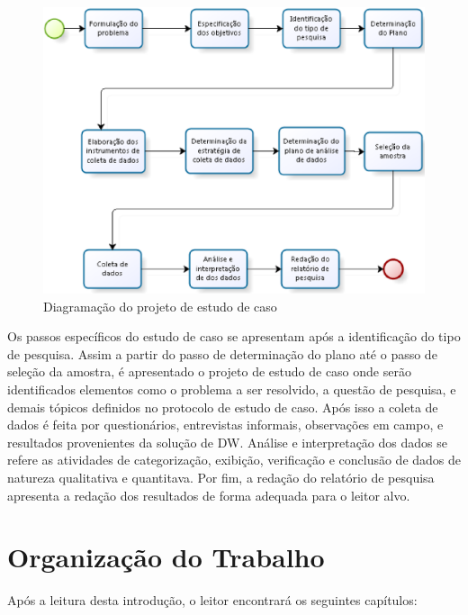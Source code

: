 \begin{figure}[h!]
\centering
\includegraphics[keepaspectratio=false,scale=0.65]{figuras/figuras_pedro/projeto-pesq.eps}
\caption{Diagramação do projeto de estudo de caso}
\label{fig:projeto-pesq}
\end{figure}
\FloatBarrier


Os passos específicos do estudo de caso se apresentam após a identificação do tipo de pesquisa. Assim a partir do passo de determinação do plano até o passo de seleção da amostra, é apresentado o projeto de estudo de caso onde serão identificados elementos como o problema a ser resolvido, a questão de pesquisa, e demais tópicos definidos no protocolo de estudo de caso. Após isso a coleta de dados é feita por questionários, entrevistas informais, observações em campo, e resultados provenientes da solução de DW. Análise e interpretação dos dados se refere as atividades de categorização,  exibição, verificação e conclusão de dados de natureza qualitativa e quantitava. Por fim, a redação do relatório de pesquisa apresenta a redação dos resultados de forma adequada para o leitor alvo.


\section{Organização do Trabalho}


Após a leitura desta introdução, o leitor encontrará os seguintes capítulos:

